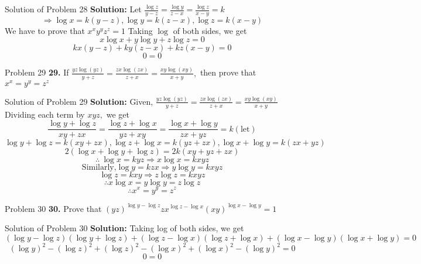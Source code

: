\documentclass[aspectratio=1610,8pt]{beamer}
\begin{document}
\begin{frame}{Solution of Problem 28}
  \textbf{Solution:} Let $\frac{\log z}{y - z} = \frac{\log y}{z - x} = \frac{\log z}{x - y} = k$
  $$\Rightarrow \log x = k(y - z), \log y = k(z - x), \log z = k(x - y)$$
  We have to prove that $x^xy^yz^z = 1$
  Taking $\log$ of both sides, we get
  $$x\log x + y\log y + z\log z = 0$$
  $$kx(y - z) + ky(z - x) + kz(x - y) = 0$$
  $$0 = 0$$
\end{frame}
\begin{frame}{Problem 29}
  \textbf{29.} If $\frac{yz\log(yz)}{y + z} = \frac{zx\log(zx)}{z + x} = \frac{xy\log(xy)}{x + y},$ then prove that $x^x = y^y = z^z$
\end{frame}
\begin{frame}{Solution of Problem 29}
  \textbf{Solution:} Given, $\frac{yz\log(yz)}{y + z} = \frac{zx\log(zx)}{z + x} = \frac{xy\log(xy)}{x + y}$
  \linebreak\linebreak
  Dividing each term by $xyz,$ we get
  $$\frac{\log y + \log z}{xy + zx} = \frac{\log z + \log x}{yz + xy} = \frac{\log x + \log y}{zx + yz} = k(\text{let})$$
  $$\log y + \log z = k(xy + zx), \log z + \log x = k(yz + zx), \log x + \log y = k(zx + yz)$$
  $$2(\log x + \log y + \log z) = 2k(xy + yz + zx)$$
  $$\therefore ~\log x = kyz \Rightarrow x\log x = kxyz$$
  $$\text{Similarly,} \log y = kzx \Rightarrow y\log y = kxyz$$
  $$\log z = kxy \Rightarrow z\log z = kxyz$$
  $$\therefore x\log x = y\log y = z\log z$$
  $$\therefore x^x = y^y = z^z$$
\end{frame}
\begin{frame}{Problem 30}
  \textbf{30.} Prove that $(yz)^{\log y - \log z}zx^{\log z - \log x}(xy)^{\log x - \log y} = 1$
\end{frame}
\begin{frame}{Solution of Problem 30}
  \textbf{Solution:} Taking log of both sides, we get
  $$(\log y - \log z)(\log y + \log z) + (\log z - \log x)(\log z + \log x) + (\log x - \log y)(\log x + \log y) = 0$$
  $$(\log y)^2 - (\log z)^2 + (\log z)^2 - (\log x)^2 + (\log x)^2 - (\log y)^2 = 0$$
  $$0 = 0$$
\end{frame}
\end{document}
